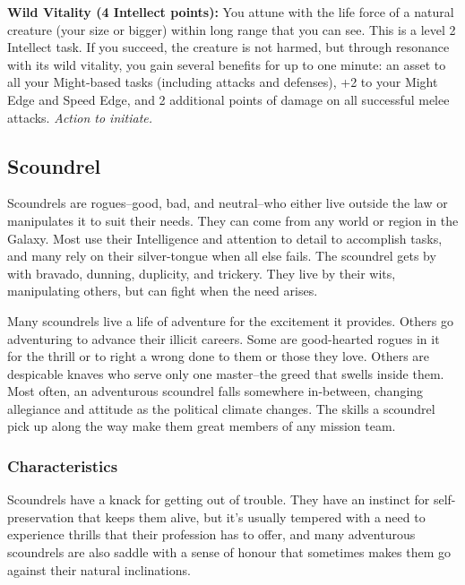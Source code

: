 \documentclass[a4paper,10pt,final,twocolumn,oneside]{book}
\newcommand{\itemAbility}[2]{\textcolor{25gray}{\textbullet\textbf{ #1:}}{ #2}\par}
\newcommand{\actionInit}{\textit{ Action to initiate.}}
\begin{document}
\itemAbility{Wild Vitality (4 Intellect points)}{You attune with the life force of a natural creature (your size or bigger) within long range that you can see. This is a level 2 Intellect task. If you succeed, the creature is not harmed, but through resonance with its wild vitality, you gain several benefits for up to one minute: an asset to all your Might-based tasks (including attacks and defenses), +2 to your Might Edge and Speed Edge, and 2 additional points of damage on all successful melee attacks.\actionInit}

\clearpage


%
%
%
%
%
%
%
%
%
%
%
%
%
%
%
%
%
%
%


\subsection{Scoundrel} %
\label{sub:scoundrel}

Scoundrels are rogues--good, bad, and neutral--who either live outside the law or manipulates it to suit their needs. They can come from any world or region in the Galaxy. Most use their Intelligence and attention to detail to accomplish tasks, and many rely on their silver-tongue when all else fails. The scoundrel gets by with bravado, dunning, duplicity, and trickery. They live by their wits, manipulating others, but can fight when the need arises.

Many scoundrels live a life of adventure for the excitement it provides. Others go adventuring to advance their illicit careers. Some are good-hearted rogues in it for the thrill or to right a wrong done to them or those they love. Others are despicable knaves who serve only one master--the greed that swells inside them. Most often, an adventurous scoundrel falls somewhere in-between, changing allegiance and attitude as the political climate changes. The skills a scoundrel pick up along the way make them great members of any mission team.

\subsubsection*{Characteristics}
\label{subsub:scoundrelCharacteristics}

Scoundrels have a knack for getting out of trouble. They have an instinct for self-preservation that keeps them alive, but it's usually tempered with a need to experience thrills that their profession has to offer, and many adventurous scoundrels are also saddle with a sense of honour that sometimes makes them go against their natural inclinations.
\end{document}
